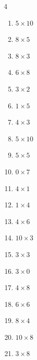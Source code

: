 \begin{multicols}{4}
\begin{enumerate}
  \item $5\times 10$
        \phantom{$=50$}

  \item $8\times 5$
        \phantom{$=40$}

  \item $8\times 3$
        \phantom{$=24$}

  \item $6\times 8$
        \phantom{$=48$}

  \item $3\times 2$
        \phantom{$=6$}

  \item $1\times 5$
        \phantom{$=5$}

  \item $4\times 3$
        \phantom{$=12$}

\columnbreak %

  \item $5\times 10$
        \phantom{$=50$}

  \item $5\times 5$
        \phantom{$=25$}

  \item $0\times 7$
        \phantom{$=0$}

  \item $4\times 1$
        \phantom{$=4$}

  \item $1\times 4$
        \phantom{$=4$}

  \item $4\times 6$
        \phantom{$=24$}

  \item $10\times 3$
        \phantom{$=30$}

  \item $3\times 3$
        \phantom{$=9$}

  \item $3\times 0$
        \phantom{$=0$}

  \item $4\times 8$
        \phantom{$=32$}

  \item $6\times 6$
        \phantom{$=36$}

  \item $8\times 4$
        \phantom{$=32$}

  \item $10\times 8$
        \phantom{$=80$}

  \item $3\times 8$
        \phantom{$=24$}


\end{enumerate}
\end{multicols}
